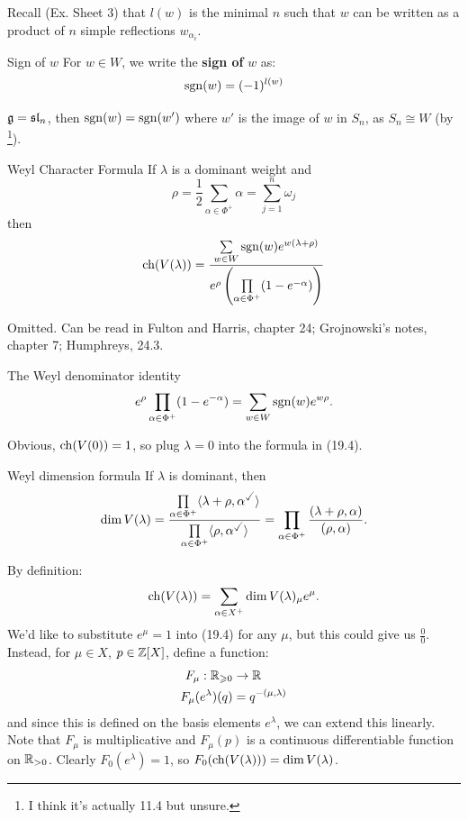 \documentclass{article}
\begin{document}
Recall (Ex. Sheet 3) that $l(w)$ is the minimal $n$ such that $w$ can be written as a product of $n$ simple reflections $w_{\alpha_{i}}$.
\begin{fancydefine*}{Sign of $w$}
    For $w \in W$, we write the \textbf{sign of} $w$ as:
    \[ \operatorname{sgn}(w) = (-1)^{l(w)} \]
\end{fancydefine*}
\begin{ex*}
    $\mathfrak{g} = \mathfrak{sl}_{n}$, then $\operatorname{sgn}(w) = \operatorname{sgn}(w')$ where $w'$ is the image of $w$ in $S_{n}$, as $S_{n} \cong W$ (by  \footnote{I think it's actually 11.4 but unsure.}).
\end{ex*}
\begin{fancythm}{Weyl Character Formula}
    If $\lambda$ is a dominant weight and \[ \rho = \frac{1}{2} \sum_{\alpha \in \Phi^{+}} \alpha = \sum\limits_{j=1}^{n}\omega_{j}\] then \[ \operatorname{ch}(V(\lambda)) = \dfrac{\sum\limits_{w \in W} \operatorname{sgn}(w) e^{w(\lambda + \rho)}}{ e^{\rho} \left(\prod\limits_{\alpha \in \Phi^{+}} (1-e^{-\alpha}) \right)} \]
\end{fancythm}
\proof Omitted. Can be read in Fulton and Harris, chapter 24; Grojnowski's notes, chapter 7; Humphreys, 24.3.
\begin{corr}{The Weyl denominator identity}
    \[e^{\rho} \prod_{\alpha \in \Phi^{+}}(1-e^{-\alpha}) = \sum_{w \in W} \operatorname{sgn}(w)e^{w\rho}.\] 
\end{corr}
\proof Obvious, $\operatorname{ch}(V(0)) = 1$, so plug $\lambda = 0$ into the formula in (19.4). \endproof 
\begin{corr}{Weyl dimension formula}
    If $\lambda$ is dominant, then \[ \dim V(\lambda) = \frac{\prod\limits_{\alpha \in \Phi^{+}} \langle \lambda + \rho, \alpha^{\checked} \rangle}{\prod\limits_{\alpha \in \Phi^{+}} \langle \rho, \alpha^{\checked} \rangle} = \prod_{\alpha \in \Phi^{+}} \frac{ (\lambda + \rho, \alpha)}{(\rho, \alpha)}.\]
\end{corr}
\proof By definition: \[\operatorname{ch}(V(\lambda)) = \sum_{\alpha \in X^{+}} \dim V(\lambda)_{\mu} e^{\mu}.\]
We'd like to substitute $e^{\mu}=1$ into (19.4) for any $\mu$, but this could give us $\frac{0}{0}$. Instead, for $\mu \in X$, $p \in \mathbb{Z}[X]$, define a function:
\begin{align*}
    F_{\mu} : \mathbb{R}_{\geqslant 0} &\to \mathbb{R}\\
    F_{\mu}(e^{\lambda})(q) &= q^{-(\mu,\lambda)}
\end{align*}
and since this is defined on the basis elements $e^{\lambda}$, we can extend this linearly. Note that $F_{\mu}$ is multiplicative and $F_{\mu}(p)$ is a continuous differentiable function on $\mathbb{R}_{>0}$. Clearly $F_{0}(e^{\lambda}) = 1$, so $F_{0}(\operatorname{ch}(V(\lambda))) = \dim V(\lambda)$.\gap 
\end{document}
